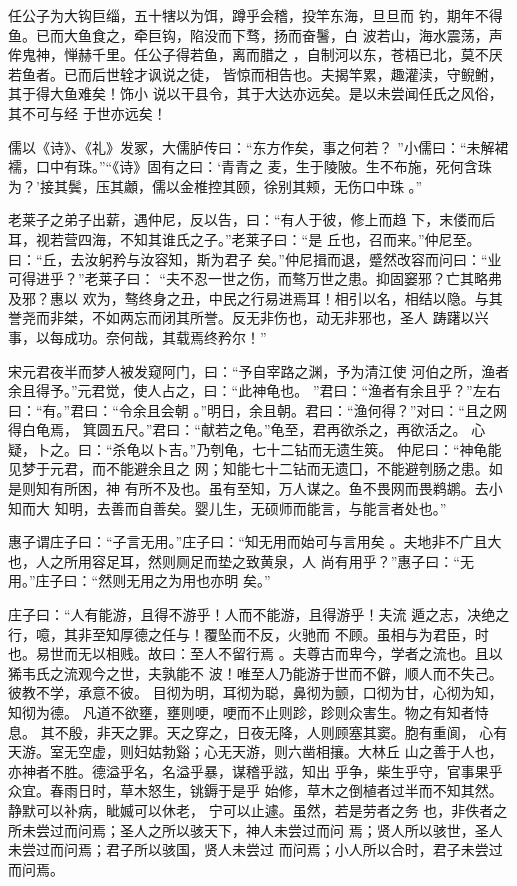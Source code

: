 \documentclass[a4paper,12pt,UTF8,twoside]{ctexbook}
\begin{document}
任公子为大钩巨缁，五十犗以为饵，蹲乎会稽，投竿东海，旦旦而 钓，期年不得鱼。已而大鱼食之，牵巨钩，陷没而下骛，扬而奋鬐，白 波若山，海水震荡，声侔鬼神，惮赫千里。任公子得若鱼，离而腊之 ，自制河以东，苍梧已北，莫不厌若鱼者。已而后世辁才讽说之徒， 皆惊而相告也。夫揭竿累，趣灌渎，守鲵鲋，其于得大鱼难矣！饰小 说以干县令，其于大达亦远矣。是以未尝闻任氏之风俗，其不可与经 于世亦远矣！

儒以《诗》、《礼》发冢，大儒胪传曰：“东方作矣，事之何若？ ”小儒曰：“未解裙襦，口中有珠。”“《诗》固有之曰：‘青青之 麦，生于陵陂。生不布施，死何含珠为？’接其鬓，压其顪，儒以金椎控其颐，徐别其颊，无伤口中珠 。”

老莱子之弟子出薪，遇仲尼，反以告，曰：“有人于彼，修上而趋 下，末偻而后耳，视若营四海，不知其谁氏之子。”老莱子曰：“是 丘也，召而来。”仲尼至。曰：“丘，去汝躬矜与汝容知，斯为君子 矣。”仲尼揖而退，蹙然改容而问曰：“业可得进乎？”老莱子曰： “夫不忍一世之伤，而骜万世之患。抑固窭邪？亡其略弗及邪？惠以 欢为，骜终身之丑，中民之行易进焉耳！相引以名，相结以隐。与其 誉尧而非桀，不如两忘而闭其所誉。反无非伤也，动无非邪也，圣人 踌躇以兴事，以每成功。奈何哉，其载焉终矜尔！”

宋元君夜半而梦人被发窥阿门，曰：“予自宰路之渊，予为清江使 河伯之所，渔者余且得予。”元君觉，使人占之，曰：“此神龟也。 ”君曰：“渔者有余且乎？”左右曰：“有。”君曰：“令余且会朝 。”明日，余且朝。君曰：“渔何得？”对曰：“且之网得白龟焉， 箕圆五尺。”君曰：“献若之龟。”龟至，君再欲杀之，再欲活之。 心疑，卜之。曰：“杀龟以卜吉。”乃刳龟，七十二钻而无遗生筴。 仲尼曰：“神龟能见梦于元君，而不能避余且之 网；知能七十二钻而无遗囗，不能避刳肠之患。如是则知有所困，神 有所不及也。虽有至知，万人谋之。鱼不畏网而畏鹈鹕。去小知而大 知明，去善而自善矣。婴儿生，无硕师而能言，与能言者处也。”

惠子谓庄子曰：“子言无用。”庄子曰：“知无用而始可与言用矣 。夫地非不广且大也，人之所用容足耳，然则厕足而垫之致黄泉，人 尚有用乎？”惠子曰：“无用。”庄子曰：“然则无用之为用也亦明 矣。”

庄子曰：“人有能游，且得不游乎！人而不能游，且得游乎！夫流 遁之志，决绝之行，噫，其非至知厚德之任与！覆坠而不反，火驰而 不顾。虽相与为君臣，时也。易世而无以相贱。故曰：至人不留行焉 。夫尊古而卑今，学者之流也。且以狶韦氏之流观今之世，夫孰能不 波！唯至人乃能游于世而不僻，顺人而不失己。彼教不学，承意不彼。 目彻为明，耳彻为聪，鼻彻为颤，口彻为甘，心彻为知，知彻为德。 凡道不欲壅，壅则哽，哽而不止则跈，跈则众害生。物之有知者恃息。 其不殷，非天之罪。天之穿之，日夜无降，人则顾塞其窦。胞有重阆， 心有天游。室无空虚，则妇姑勃谿；心无天游，则六凿相攘。大林丘 山之善于人也，亦神者不胜。德溢乎名，名溢乎暴，谋稽乎誸，知出 乎争，柴生乎守，官事果乎众宜。春雨日时，草木怒生，铫鎒于是乎 始修，草木之倒植者过半而不知其然。静默可以补病，眦媙可以休老， 宁可以止遽。虽然，若是劳者之务 也，非佚者之所未尝过而问焉；圣人之所以骇天下，神人未尝过而问 焉；贤人所以骇世，圣人未尝过而问焉；君子所以骇国，贤人未尝过 而问焉；小人所以合时，君子未尝过而问焉。
\end{document}
